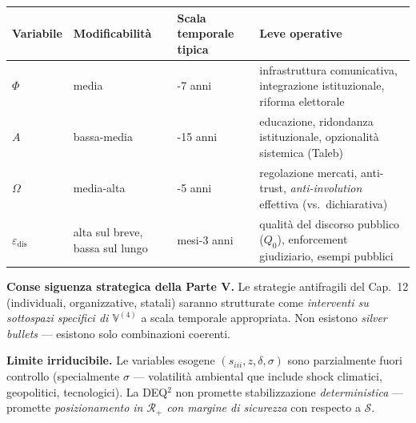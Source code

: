 {\def\LTcaptype{none} %
{\small\begin{longtable}[]{@{}
  >{\raggedright\arraybackslash}p{}
  >{\raggedright\arraybackslash}p{}
  >{\raggedright\arraybackslash}p{}
  >{\raggedright\arraybackslash}p{}@{}}
\toprule\noalign{}
\begin{minipage}[b]{\linewidth}\raggedright
Variabile
\end{minipage} & \begin{minipage}[b]{\linewidth}\raggedright
Modificabilità
\end{minipage} & \begin{minipage}[b]{\linewidth}\raggedright
Scala temporale tipica
\end{minipage} & \begin{minipage}[b]{\linewidth}\raggedright
Leve operative
\end{minipage} \\
\midrule\noalign{}
\endhead
\bottomrule\noalign{}
\endlastfoot
\(\Phi\) & media & 3-7 anni & infrastruttura comunicativa, integrazione
istituzionale, riforma elettorale \\
\(A\) & bassa-media & 5-15 anni & educazione, ridondanza istituzionale,
opzionalità sistemica (Taleb) \\
\(\Omega\) & media-alta & 1-5 anni & regolazione mercati, anti-trust,
\emph{anti-involution} effettiva (vs.~dichiarativa) \\
\(\varepsilon_{\text{dis}}\) & alta sul breve, bassa sul lungo & 6
mesi-3 anni & qualità del discorso pubblico (\(Q_0\)), enforcement
giudiziario, esempi pubblici \\
\end{longtable}}
}

\Proved{} \textbf{Conse siguenza strategica della Parte V.} Le strategie
antifragili del Cap.~12 (individuali, organizzative, statali) saranno
strutturate come \emph{interventi su sottospazi specifici di
\(\mathbb{V}^{(4)}\)} a scala temporale appropriata. Non esistono
\emph{silver bullets} --- esistono solo combinazioni coerenti.

\Conj{} \textbf{Limite irriducibile.} Le variables esogene
\((s_{iii}, z, \delta, \sigma)\) sono parzialmente fuori controllo
(specialmente \(\sigma\) --- volatilità ambiental que include shock
climatici, geopolitici, tecnologici). La DEQ$^2$ non promette
stabilizzazione \emph{deterministica} --- promette \emph{posizionamento
in \(\mathcal{R}_+\) con margine di sicurezza} con respecto a
\(\mathcal{S}\).



